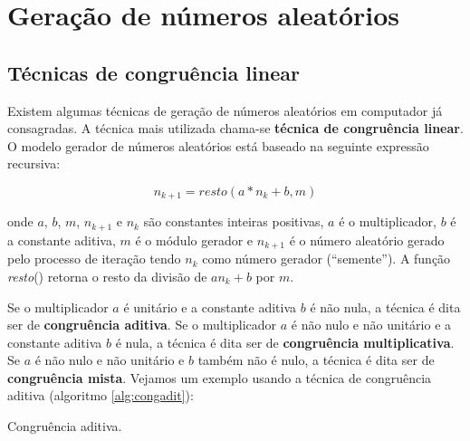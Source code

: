 \documentclass[a4paper,12pt,oneside,onecolumn]{uerj}
\begin{document}
\chapter{Geração de números aleatórios}

\section{Técnicas de congruência linear}

Existem algumas técnicas de geração de números aleatórios em computador já consagradas. A técnica mais utilizada chama-se \textbf{técnica de congruência linear}. O modelo gerador de números aleatórios está baseado na seguinte expressão recursiva:

\begin{equation}
n_{k+1} = resto(a*n_{k} + b,m)
\end{equation}

\noindent onde $a$, $b$, $m$, $n_{k+1}$ e $n_{k}$ são constantes inteiras positivas, $a$ é o multiplicador, $b$ é a constante aditiva, $m$ é o módulo gerador e $n_{k+1}$ é o número aleatório gerado pelo processo de iteração tendo $n_k$ como número gerador (``semente''). A função \emph{resto}() retorna o resto da divisão de $an_{k} + b$ por $m$.

Se o multiplicador $a$ é unitário e a constante aditiva $b$ é não nula, a técnica é dita ser de \textbf{congruência aditiva}. Se o multiplicador $a$ é não nulo e não unitário e a constante aditiva $b$ é nula, a técnica é dita ser de \textbf{congruência multiplicativa}. Se $a$ é não nulo e não unitário e $b$ também não é nulo, a técnica é dita ser de \textbf{congruência mista}. Vejamos um exemplo usando a técnica de congruência aditiva (algoritmo \ref{alg:congadit}):

\begin{algorithm}[!ht]
    \caption{Congruência aditiva.} \label{alg:congadit}
    \begin{pseudocode}
      \Documentacao
        \Algoritmo{}
          \FimPara
        \FimAlgoritmo
      \FimDocumentacao
    \end{pseudocode}
\end{algorithm}
\end{document}
